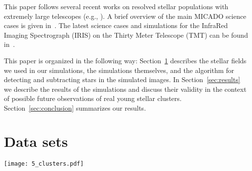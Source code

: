 \documentclass{aa}
\newcommand{\msun}{M$_\odot$~}
\newcommand{\msune}{M$_\odot$}
\begin{document}
This paper follows several recent works on resolved stellar populations with extremely large telescopes
(e.g., \citealt{deep11, greggio12, gullieuszik15, tolstoy19_iau}).
A brief overview of the main MICADO science cases is given in~\cite{micado2016}.
The latest science cases and simulations for the InfraRed Imaging Spectrograph (IRIS) on the Thirty Meter Telescope (TMT) can be found in~\cite{tmt_iris16}.

This paper is organized in the following way: Section~\ref{sec:observations} describes the stellar fields we used in our simulations, the simulations themselves, and the algorithm for detecting and subtracting stars in the simulated images.
In Section~\ref{sec:results} we describe the results of the simulations and discuss their validity in the context of possible future observations of real young stellar clusters.
Section~\ref{sec:conclusion} summarizes our results.



\section{Data sets}
\label{sec:observations}


\begin{figure*}
    \centering
    \texttt{[image: 5\_clusters.pdf]}
    \caption{Illustration of the synthetic data.
    The model young massive cluster depicted here contains a mass of 2$\times$10$^4$\,\msun ($\sim$5$\times$10$^4$ stars) and has a half-light radius of 1\,pc.
    It contains stars in the mass range [0.01, 100]\msune, sampled from a Kroupa IMF.
    The model cluster was observed with the MICADO instrument simulator at distances from 8\,kpc to 800\,kpc.
    The top row shows the cluster as seen by the central detector of MICADO (covering an on-sky area of 16\arcsec$\times$16\arcsec).
    The bottom row shows a 2\arcsec$\times$2\arcsec window (512$\times$512 pixels) at the centre of this detector.
    This is the area we used for our study.
    Here the unique structure of the ELT PSF is visible.
    This figure illustrates the difficulties that observers will face when crowded fields are studied with MICADO and the ELT.
    }
    \label{fig:5_clusters}
\end{figure*}
\end{document}
